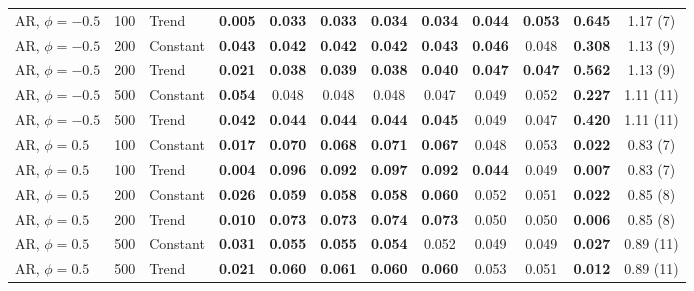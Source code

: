\begin{tabular}{lrlccccccccc}
AR, $\phi = -0.5$ & 100 & Trend & \textbf{0.005} & \textbf{0.033} & \textbf{0.033} & \textbf{0.034} & \textbf{0.034} & \textbf{0.044} & \textbf{0.053} & \textbf{0.645} & 1.17 (7) \\
AR, $\phi = -0.5$ & 200 & Constant & \textbf{0.043} & \textbf{0.042} & \textbf{0.042} & \textbf{0.042} & \textbf{0.043} & \textbf{0.046} & 0.048 & \textbf{0.308} & 1.13 (9) \\
AR, $\phi = -0.5$ & 200 & Trend & \textbf{0.021} & \textbf{0.038} & \textbf{0.039} & \textbf{0.038} & \textbf{0.040} & \textbf{0.047} & \textbf{0.047} & \textbf{0.562} & 1.13 (9) \\
AR, $\phi = -0.5$ & 500 & Constant & \textbf{0.054} & 0.048 & 0.048 & 0.048 & 0.047 & 0.049 & 0.052 & \textbf{0.227} & 1.11 (11) \\
AR, $\phi = -0.5$ & 500 & Trend & \textbf{0.042} & \textbf{0.044} & \textbf{0.044} & \textbf{0.044} & \textbf{0.045} & 0.049 & 0.047 & \textbf{0.420} & 1.11 (11) \\
\addlinespace
AR, $\phi = 0.5$ & 100 & Constant & \textbf{0.017} & \textbf{0.070} & \textbf{0.068} & \textbf{0.071} & \textbf{0.067} & 0.048 & 0.053 & \textbf{0.022} & 0.83 (7) \\
AR, $\phi = 0.5$ & 100 & Trend & \textbf{0.004} & \textbf{0.096} & \textbf{0.092} & \textbf{0.097} & \textbf{0.092} & \textbf{0.044} & 0.049 & \textbf{0.007} & 0.83 (7) \\
AR, $\phi = 0.5$ & 200 & Constant & \textbf{0.026} & \textbf{0.059} & \textbf{0.058} & \textbf{0.058} & \textbf{0.060} & 0.052 & 0.051 & \textbf{0.022} & 0.85 (8) \\
AR, $\phi = 0.5$ & 200 & Trend & \textbf{0.010} & \textbf{0.073} & \textbf{0.073} & \textbf{0.074} & \textbf{0.073} & 0.050 & 0.050 & \textbf{0.006} & 0.85 (8) \\
AR, $\phi = 0.5$ & 500 & Constant & \textbf{0.031} & \textbf{0.055} & \textbf{0.055} & \textbf{0.054} & 0.052 & 0.049 & 0.049 & \textbf{0.027} & 0.89 (11) \\
AR, $\phi = 0.5$ & 500 & Trend & \textbf{0.021} & \textbf{0.060} & \textbf{0.061} & \textbf{0.060} & \textbf{0.060} & 0.053 & 0.051 & \textbf{0.012} & 0.89 (11) \\
\bottomrule
\end{tabular}
